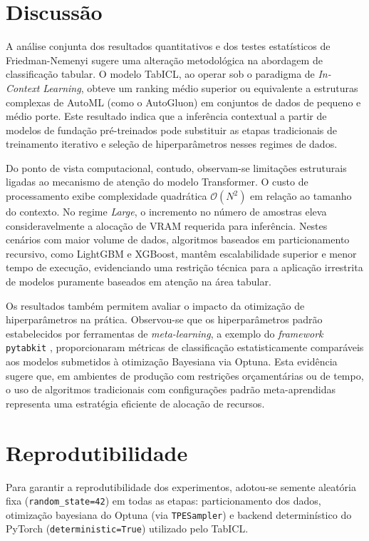 \documentclass[12pt,a4paper]{article}
\begin{document}
\section{Discussão}

A análise conjunta dos resultados quantitativos e dos testes estatísticos de Friedman-Nemenyi sugere uma alteração metodológica na abordagem de classificação tabular. O modelo TabICL, ao operar sob o paradigma de \textit{In-Context Learning}, obteve um ranking médio superior ou equivalente a estruturas complexas de AutoML (como o AutoGluon) em conjuntos de dados de pequeno e médio porte. Este resultado indica que a inferência contextual a partir de modelos de fundação pré-treinados pode substituir as etapas tradicionais de treinamento iterativo e seleção de hiperparâmetros nesses regimes de dados.

Do ponto de vista computacional, contudo, observam-se limitações estruturais ligadas ao mecanismo de atenção do modelo Transformer. O custo de processamento exibe complexidade quadrática $\mathcal{O}(N^2)$ em relação ao tamanho do contexto. No regime \textit{Large}, o incremento no número de amostras eleva consideravelmente a alocação de VRAM requerida para inferência. Nestes cenários com maior volume de dados, algoritmos baseados em particionamento recursivo, como LightGBM e XGBoost, mantêm escalabilidade superior e menor tempo de execução, evidenciando uma restrição técnica para a aplicação irrestrita de modelos puramente baseados em atenção na área tabular.

Os resultados também permitem avaliar o impacto da otimização de hiperparâmetros na prática. Observou-se que os hiperparâmetros padrão estabelecidos por ferramentas de \textit{meta-learning}, a exemplo do \textit{framework} \texttt{pytabkit} \cite{holzmuller2024better}, proporcionaram métricas de classificação estatisticamente comparáveis aos modelos submetidos à otimização Bayesiana via Optuna. Esta evidência sugere que, em ambientes de produção com restrições orçamentárias ou de tempo, o uso de algoritmos tradicionais com configurações padrão meta-aprendidas representa uma estratégia eficiente de alocação de recursos.

\section{Reprodutibilidade}
Para garantir a reprodutibilidade dos experimentos, adotou-se semente aleatória fixa (\texttt{random\_state=42}) em todas as etapas: particionamento dos dados, otimização bayesiana do Optuna (via \texttt{TPESampler}) e backend determinístico do PyTorch (\texttt{deterministic=True}) utilizado pelo TabICL.
\end{document}
